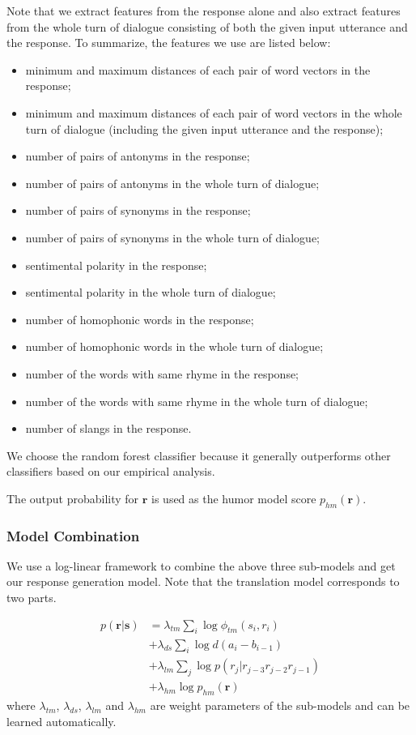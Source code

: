\documentclass[letterpaper]{article} %
\begin{document}
\begin{CJK*}{UTF8}{gbsn}
Note that we extract features from the response alone and also extract features from the whole turn of dialogue consisting of both the given input utterance and the response. To summarize, the features we use are listed below:

\begin{itemize}
	\item minimum and maximum distances of each pair of word vectors in the response;
	\item minimum and maximum distances of each pair of word vectors in the whole turn of dialogue (including the given input utterance and the response);
	\item number of pairs of antonyms in the response;
	\item number of pairs of antonyms in the whole turn of dialogue;
	\item number of pairs of synonyms in the response;
	\item number of pairs of synonyms in the whole turn of dialogue;
	\item sentimental polarity in the response;
	\item sentimental polarity in the whole turn of dialogue;
	\item number of homophonic words in the response;
	\item number of homophonic words in the whole turn of dialogue;
	\item number of the words with same rhyme in the response;
	\item number of the words with same rhyme in the whole turn of dialogue;
	\item number of slangs in the response.
\end{itemize}

We choose the random forest classifier \cite{Liaw2002} because it generally outperforms other classifiers based on our empirical analysis. 

The output probability for $\mathbf{r}$ is used as the humor model score $p_{hm}({\mathbf r})$.

\subsubsection{Model Combination}
We use a log-linear framework to combine the above three sub-models and get our response generation model. Note that the translation model corresponds to two parts. 

\begin{equation}
	\begin{split}
		p({\mathbf r}|{\mathbf s})
		&= \lambda_{tm} \sum_i \log \phi_{tm}(s_i, r_i)\\
		&+ \lambda_{ds} \sum_i \log d(a_i - b_{i-1})\\
		&+ \lambda_{lm} \sum_j \log p(r_j|r_{j-3}r_{j-2}r_{j-1})\\
		&%
		+ \lambda_{hm} \log p_{hm}({\mathbf r})
	\end{split}
\end{equation}
where $\lambda_{tm}$, $\lambda_{ds}$, $\lambda_{lm}$%
and $\lambda_{hm}$ are weight parameters of the sub-models and can be learned automatically.  


\end{CJK*}
\end{document}
